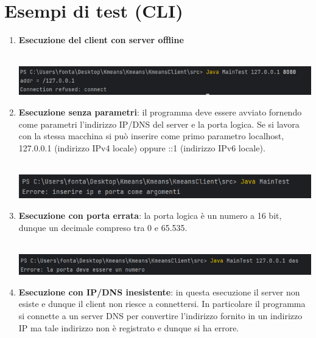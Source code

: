 \section{Esempi di test (CLI)}
\begin{enumerate}
  \item \textbf{Esecuzione del client con server offline} \\ \\
  \begin{minipage}[t]{0.3\textwidth}
    \includegraphics[scale=0.8]{img/test1.png}
  \end{minipage}
  \item \textbf{Esecuzione senza parametri}: il programma deve essere avviato fornendo come parametri l'indirizzo IP/DNS del server e la porta logica. Se si lavora con la stessa macchina si può inserire come primo parametro localhost, 127.0.0.1 (indirizzo IPv4 locale) oppure ::1 (indirizzo IPv6 locale). \\ \\
  \begin{minipage}[t]{0.3\textwidth}
    \includegraphics[scale=0.8]{img/test2.png}
  \end{minipage}
  \item \textbf{Esecuzione con porta errata}: la porta logica è un numero a 16 bit, dunque un decimale compreso tra 0 e 65.535. \\ \\
  \begin{minipage}[t]{0.3\textwidth}
    \includegraphics[scale=0.8]{img/test3.png}
  \end{minipage}
  \item \textbf{Esecuzione con IP/DNS inesistente}: in questa esecuzione il server non esiste e dunque il client non riesce a connettersi. In particolare il programma si connette a un server DNS per convertire l'indirizzo fornito in un indirizzo IP ma tale indirizzo non è registrato e dunque si ha errore. \\ \\

\end{enumerate}
